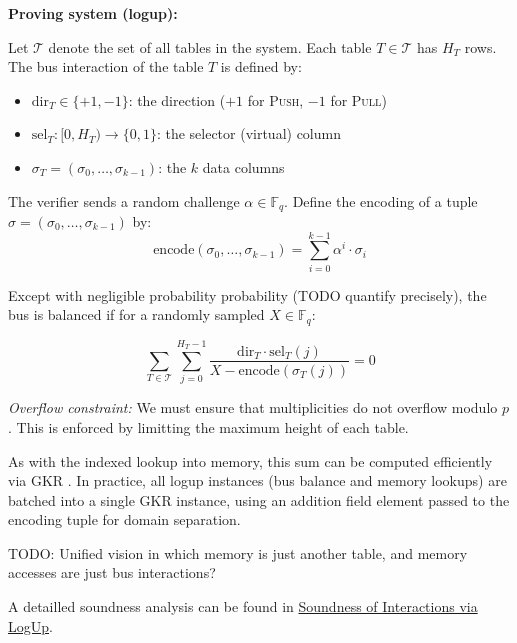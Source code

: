 \documentclass{article}
\theoremstyle{definition}
\newcommand{\Fq}{\mathbb F_q}
\begin{document}
\vspace{5mm}

\textbf{Proving system (logup):}

Let $\mathcal{T}$ denote the set of all tables in the system. Each table $T \in \mathcal{T}$ has $H_T$ rows. The bus interaction of the table $T$ is defined by:
\begin{itemize}
    \item $\text{dir}_{T} \in \{+1, -1\}$: the direction ($+1$ for \textsc{Push}, $-1$ for \textsc{Pull})
    \item $\text{sel}_{T}: [0, H_T) \to \{0, 1\}$: the selector (virtual) column
    \item $\sigma_{T} = (\sigma_0, \ldots, \sigma_{k-1})$: the $k$ data columns
\end{itemize}

\vspace{3mm}

The verifier sends a random challenge $\alpha \in \Fq$. Define the encoding of a tuple $\sigma = (\sigma_0, \ldots, \sigma_{k-1})$ by:
$$\text{encode}(\sigma_0, \ldots, \sigma_{k-1}) = \sum_{i=0}^{k-1} \alpha^{i} \cdot \sigma_i$$

\vspace{3mm}

Except with negligible probability probability (TODO quantify precisely), the bus is balanced if for a randomly sampled $X \in \Fq$:

$$\sum_{T \in \mathcal{T}} \sum_{j=0}^{H_T - 1} \frac{\text{dir}_{T} \cdot \text{sel}_{T}(j)}{X - \text{encode}(\sigma_{T}(j))} = 0$$


\vspace{3mm}

\textit{Overflow constraint:} We must ensure that multiplicities do not overflow modulo $p$. This is enforced by limitting the maximum height of each table.

\vspace{3mm}

As with the indexed lookup into memory, this sum can be computed efficiently via GKR \cite{logup_gkr}. In practice, all logup instances (bus balance and memory lookups) are batched into a single GKR instance, using an addition field element passed to the encoding tuple for domain separation.

\vspace{3mm} TODO: Unified vision in which memory is just another table, and memory accesses are just bus interactions?

A detailled soundness analysis can be found in \href{https://github.com/openvm-org/stark-backend/blob/main/docs/Soundness_of_Interactions_via_LogUp.pdf}{Soundness of Interactions via LogUp}.
\end{document}
